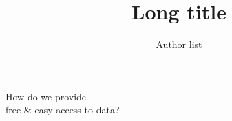
\parindent 0cm

\author[Short author list]{Author list}
  
  
\title[Short title]{Long title}






{
\begin{frame}
\centering

\footnotesize
\maketitle

\end{frame}
}


\begin{frame}[c]
\frametitle{}
\huge 
How do we provide \\
free \& easy access to data? 
\end{frame}


\begin{frame}[c]
\huge

\vspace{1cm}
\shadowoffset{2pt}
 \\

\end{frame}



